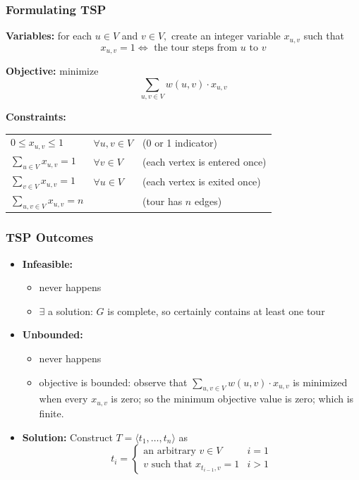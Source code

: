 \documentclass[10pt,aspectratio=169]{beamer}
\begin{document}
  \begin{frame} \frametitle{Formulating TSP}
  \textbf{Variables:} for each $u \in V$ and $v \in V,$ create an integer variable $x_{u, v}$ such that
  \[ x_{u,v} = 1 \Leftrightarrow \text{ the tour steps from } u \text{ to } v \]
  
  \textbf{Objective:} minimize
  \[ \sum_{u, v \in V} w(u, v) \cdot x_{u, v} \]
  
  \textbf{Constraints:}
  \begin{tabular}{lll}
    $0 \leq x_{u, v} \leq 1$ & $\forall u, v \in V$ & (0 or 1 indicator) \\
    $\sum_{u \in V} x_{u, v} = 1 $ & $\forall v \in V$ & (each vertex is entered once) \\
    $\sum_{v \in V} x_{u, v} = 1 $ & $\forall u \in V$ & (each vertex is exited once) \\
    $\sum_{u, v \in V} x_{u, v} = n$ & & (tour has $n$ edges) 
  \end{tabular}
  
  \end{frame}
  
  \begin{frame} \frametitle{TSP Outcomes}
    \begin{itemize}
      \item \textbf{Infeasible:}
        \begin{itemize}
        \item never happens
        \item $\exists$ a solution: $G$ is complete, so certainly contains at least one tour
        \end{itemize}
      \item \textbf{Unbounded:}
      \begin{itemize}
        \item never happens
        \item objective is bounded: observe that $\sum_{u, v \in V} w(u, v) \cdot x_{u, v}$
          is minimized when every $x_{u,v}$ is zero; so the minimum objective value is zero; which is finite.
      \end{itemize}
      \item \textbf{Solution:} Construct $T=\langle t_1, \ldots, t_n \rangle$ as
       \[
        t_i =
        \begin{cases}
          \text{an arbitrary } v \in V & i=1 \\
          v \text{ such that } x_{t_{i-1}, v}=1 & i>1 
        \end{cases}
       \]
      \end{itemize}
    \end{frame}
  
\end{document}
